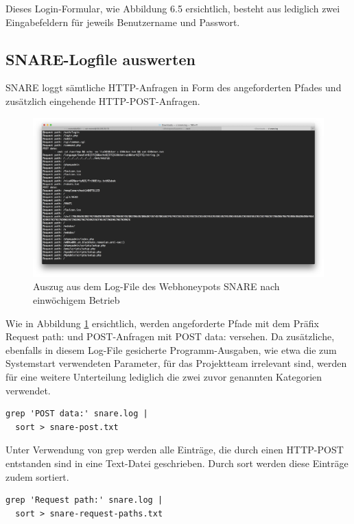 Dieses Login-Formular, wie Abbildung 6.5 ersichtlich, besteht aus lediglich zwei Eingabefeldern für jeweils Benutzername und Passwort.

\subsection{SNARE-Logfile auswerten}
\label{subsec:Installation und Konfiguration SNARE}

SNARE loggt sämtliche HTTP-Anfragen in Form des angeforderten Pfades und zusätzlich eingehende HTTP-POST-Anfragen.

\begin{figure}[ht]
	\centering
		\includegraphics[width=1.0\textwidth]{img/snare_logfile.png}
	\caption{Auszug aus dem Log-File des Webhoneypots SNARE nach einwöchigem Betrieb}
	\label{fig:snare_login}
\end{figure}

Wie in Abbildung \ref{fig:snare_login} ersichtlich, werden angeforderte Pfade mit dem Präfix \grqq{}Request path:\grqq{} und POST-Anfragen mit \grqq{}POST data:\grqq{} versehen. Da zusätzliche, ebenfalls in diesem Log-File gesicherte Programm-Ausgaben, wie etwa die zum Systemstart verwendeten Parameter, für das Projektteam irrelevant sind, werden für eine weitere Unterteilung lediglich die zwei zuvor genannten Kategorien verwendet.


\begin{lstlisting}[style=customc]
grep 'POST data:' snare.log |
  sort > snare-post.txt
\end{lstlisting}

Unter Verwendung von grep werden alle Einträge, die durch einen HTTP-POST entstanden sind in eine Text-Datei geschrieben. Durch sort werden diese Einträge zudem sortiert.

\begin{lstlisting}[style=customc]
grep 'Request path:' snare.log |
  sort > snare-request-paths.txt
\end{lstlisting}

